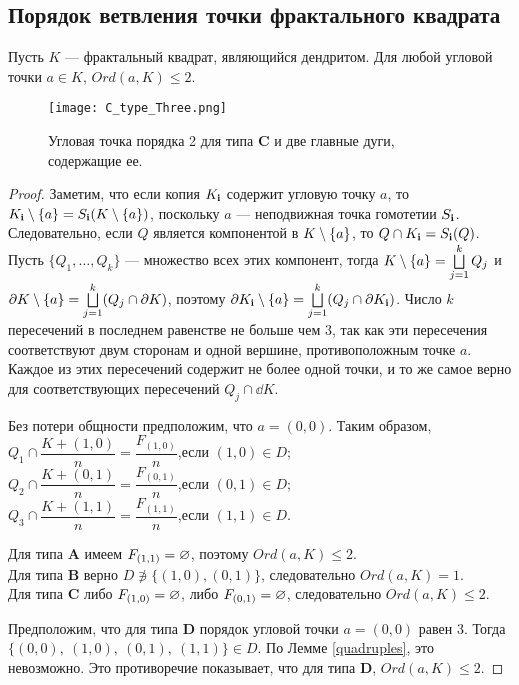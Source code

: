 \subsection{Порядок ветвления точки фрактального квадрата}

\begin{lemma}\label{thm:vertex_branching}
Пусть $K$ --- фрактальный квадрат, являющийся дендритом.
Для любой угловой точки $a\in K$,
 $Ord(a,K)\leq 2$.
\end{lemma}

\begin{figure}[h!]
\centering
\texttt{[image: C\_type\_Three.png]}
\caption{Угловая точка порядка 2 для типа {\bf C} и две главные дуги, содержащие ее.} 
\label{fig:C_type_Three}
\end{figure}

\begin{proof}\label{proof:vertex_branching}
Заметим, что если копия $K_{\bf{i}}$ содержит угловую точку $a$, то 
$K_{\bf{i}}\setminus \{a\}=S_{\bf{i}}(K\setminus \{a\})$, поскольку $a$ --- неподвижная точка гомотетии $S_{\bf{i}}$.
Следовательно, если $Q$ является компонентой в $K\setminus \{a\}$, то $Q\cap K_{\bf{i}}=S_{\bf{i}}(Q)$. 
Пусть $\{Q_1,\ldots, Q_k\}$ --- множество всех этих компонент, тогда $K\setminus \{a\}=\bigsqcup \limits_{j=1}^kQ_j$ и $\partial K\setminus \{a\}=\bigsqcup \limits_{j=1}^k(Q_j\cap\partial K)$, поэтому $\partial K_{\bf{i}}\setminus \{a\}=\bigsqcup \limits_{j=1}^k(Q_j\cap\partial K_{\bf{i}})$. 
Число $k$ пересечений в последнем равенстве не больше чем $3$, так как эти пересечения соответствуют двум сторонам и одной вершине, противоположным точке $a$. 
Каждое из этих пересечений содержит не более одной точки, и то же самое верно для соответствующих пересечений $Q_j\cap\dd K$.

Без потери общности предположим, что  $a=(0,0)$.
Таким образом,\\ 
$Q_1\cap\dfrac{K+(1,0)}{n} =\dfrac{F_{(1,0)}}{n}$,\quad если $(1,0)\in D$;\\
$Q_2\cap\dfrac{K+(0,1)}{n} =\dfrac{F_{(0,1)}}{n}$,\quad если $(0,1)\in D$;\\ 
$Q_3\cap\dfrac{K+(1,1)}{n} =\dfrac{F_{(1,1)}}{n}$,\quad если $(1,1)\in D$.

\noindent 
Для типа {\bf A} имеем $F_{(1,1)}=\varnothing$, поэтому $Ord(a,K)\leq 2$.\\
Для типа {\bf B} верно $D\not\ni\{(1,0),(0,1)\}$, следовательно $Ord(a,K)=1$.\\
Для типа {\bf C} либо $F_{(1,0)}=\varnothing$, либо $F_{(0,1)}=\varnothing$, следовательно $Ord(a,K)\leq 2$.

Предположим, что для типа {\bf D} порядок угловой точки $a=(0,0)$ равен $3$.
Тогда $\{(0,0),\ (1,0),\ (0,1),\ (1,1)\}\in D$. 
По Лемме \ref{quadruples}, это невозможно.
Это противоречие показывает, что для типа {\bf D}, $Ord(a,K)\leq 2$.
\end{proof}

